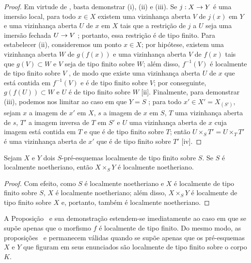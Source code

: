 \documentclass[oneside]{amsart}
\makeatletter
\newcommand{\ega@arrow}[2]{\mathchoice{#1}{#2}{#2}{#2}}
\renewcommand{\to}{\ega@arrow{\longrightarrow}{\rightarrow}}
\newcommand{\oldpage}[2][]{{\marginnote{\normalfont\textbf{#1}~|~#2}}\ignorespaces}
\let\EGAOriginalLabel\label
\renewcommand{\label}[1]{\phantomsection\EGAOriginalLabel{#1}}
\makeatother
\begin{document}
\begin{proof}
Em virtude de , basta demonstrar (i), (ii) e (iii).
Se $j:X\to Y$ é uma imersão local, para todo $x\in X$ existem uma vizinhança aberta $V$ de $j(x)$ em $Y$ e uma vizinhança aberta $U$ de $x$ em $X$ tais que a restrição de $j$ a $U$ seja uma imersão fechada $U\to V$ ; portanto, essa restrição é de tipo finito.
Para estabelecer (ii), consideremos um ponto $x\in X$;
por hipótese, existem uma vizinhança aberta $W$ de $g(f(x))$ e uma vizinhança aberta $V$ de $f(x)$ tais que $g(V)\subset W$ e $V$ seja de tipo finito sobre $W$;
além disso, $f^{-1}(V)$ é localmente de tipo finito sobre $V$ , de modo que existe uma vizinhança aberta $U$ de $x$ que
\oldpage[I]{155}
está contida em $f^{-1}(V)$ e é de tipo finito sobre $V$;
por conseguinte, $g(f(U))\subset W$ e $U$ é de tipo finito sobre $W$ [ii].
Finalmente, para demonstrar (iii), podemos nos limitar ao caso em que $Y=S$ ;
para todo $x'\in X'=X_{(S')}$, sejam $x$ a imagem de $x'$ em $X$, $s$ a imagem de $x$ em $S$, $T$ uma vizinhança aberta de $s$, $T'$ a imagem inversa de $T$ em $S'$ e $U$ uma vizinhança aberta de $x$ cuja imagem está contida em $T$ e que é de tipo finito sobre $T$;
então $U\times_S T'=U\times_T T'$ é uma vizinhança aberta de $x'$  que é de tipo finito sobre $T'$ [iv].
\end{proof}

\begin{corollary}[6.6.7]
\label{I.6.6.7}
Sejam $X$ e $Y$ dois $S$-pré-esquemas localmente de tipo finito sobre $S$.
Se $S$ é localmente noetheriano, então $X\times_S Y$ é localmente noetheriano.
\end{corollary}

\begin{proof}
Com efeito, como $S$ é localmente noetheriano e $X$ é localmente de tipo finito sobre $S$, $X$ é localmente noetheriano; além disso, $X\times_S Y$ é localmente de tipo finito sobre $X$ e, portanto, também é localmente noetheriano.
\end{proof}

\begin{remark}[6.6.8]
\label{I.6.6.8}
A Proposição~ e sua demonstração estendem-se imediatamente ao caso em que se supõe apenas que o morfismo $f$ é localmente de tipo finito.
Do mesmo modo, as proposições~ e  permanecem válidas quando se supõe apenas que os pré-esquemas $X$ e $Y$ que figuram em seus enunciados são localmente de tipo finito sobre o corpo $K$.
\end{remark}
\end{document}
